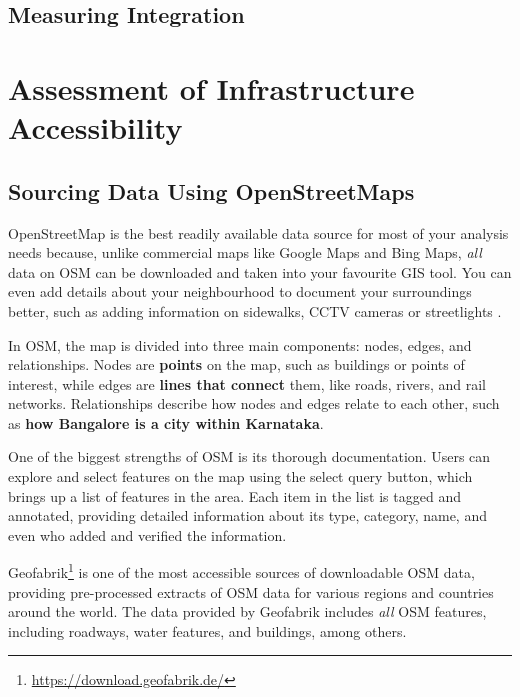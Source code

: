 \documentclass[
]{latex/krantz}
\renewcommand{\href}[2]{#2\footnote{\url{#1}}}
\DeclareRobustCommand{\href}[2]{#2\footnote{\url{#1}}}
\begin{document}
\hypertarget{measuring-integration}{%
\subsection{Measuring Integration}\label{measuring-integration}}

\hypertarget{assessment-of-infrastructure-accessibility}{%
\section{Assessment of Infrastructure Accessibility}\label{assessment-of-infrastructure-accessibility}}

\hypertarget{osm-extract}{%
\subsection{Sourcing Data Using OpenStreetMaps}\label{osm-extract}}

OpenStreetMap is the best readily available data source for most of your analysis needs because, unlike commercial maps like Google Maps and Bing Maps, \emph{all} data on OSM can be downloaded and taken into your favourite GIS tool. You can even add details about your neighbourhood to document your surroundings better, such as adding information on sidewalks, CCTV cameras or streetlights \autocite{safeyelliStreetlampsBusinessesSurveyed2022}.

In OSM, the map is divided into three main components: nodes, edges, and relationships. Nodes are \textbf{points} on the map, such as buildings or points of interest, while edges are \textbf{lines that connect} them, like roads, rivers, and rail networks. Relationships describe how nodes and edges relate to each other, such as \textbf{how Bangalore is a city within Karnataka}.

One of the biggest strengths of OSM is its thorough documentation. Users can explore and select features on the map using the select query button, which brings up a list of features in the area. Each item in the list is tagged and annotated, providing detailed information about its type, category, name, and even who added and verified the information.

\href{https://download.geofabrik.de/}{Geofabrik} is one of the most accessible sources of downloadable OSM data, providing pre-processed extracts of OSM data for various regions and countries around the world. The data provided by Geofabrik includes \emph{all} OSM features, including roadways, water features, and buildings, among others.
\end{document}
